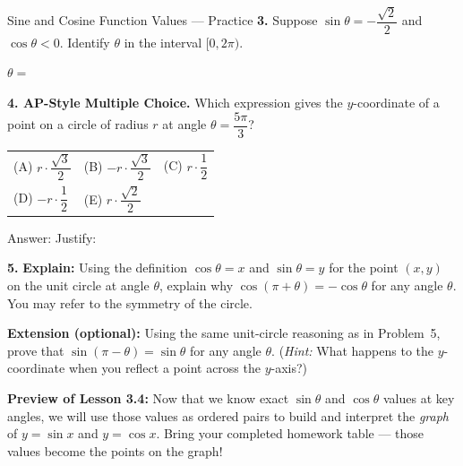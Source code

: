 \documentclass[10pt]{article}
\begin{document}
\begin{notesbox}{Sine and Cosine Function Values --- Practice}
\textbf{3.} Suppose $\sin\theta = -\dfrac{\sqrt{2}}{2}$ and $\cos\theta < 0$.
Identify $\theta$ in the interval $[0, 2\pi)$.

\vspace{0.6in}

$\theta = $ \underline{\hspace{2.2cm}}

\vspace{0.14in}

\textbf{4. AP-Style Multiple Choice.} Which expression gives the $y$-coordinate of
a point on a circle of radius $r$ at angle $\theta = \dfrac{5\pi}{3}$?

\medskip
\begin{tabular}{@{}lll@{}}
(A) $r \cdot \dfrac{\sqrt{3}}{2}$ \quad &
(B) $-r \cdot \dfrac{\sqrt{3}}{2}$ \quad &
(C) $r \cdot \dfrac{1}{2}$ \\[8pt]
(D) $-r \cdot \dfrac{1}{2}$ \quad &
(E) $r \cdot \dfrac{\sqrt{2}}{2}$ &
\end{tabular}

\vspace{0.1in}
Answer: \underline{\hspace{1.6cm}} \quad Justify: \underline{\hspace{6.5cm}}

\vspace{0.14in}

\textbf{5.} \textbf{Explain:} Using the definition $\cos\theta = x$ and $\sin\theta = y$
for the point $(x, y)$ on the unit circle at angle $\theta$, explain why $\cos(\pi + \theta) = -\cos\theta$
for any angle $\theta$. You may refer to the symmetry of the circle.

\vspace{1.1in}

\end{notesbox}

\begin{extensionbox}
\textbf{Extension (optional):} Using the same unit-circle reasoning as in Problem~5,
prove that $\sin(\pi - \theta) = \sin\theta$ for any angle $\theta$.
(\textit{Hint:} What happens to the $y$-coordinate when you reflect a point across the $y$-axis?)
\end{extensionbox}

\vspace{0.1in}

\begin{tcolorbox}[colback=goldbg, colframe=goldacc, arc=2mm,
    left=3mm, right=3mm, top=2mm, bottom=2mm]
\small\textbf{Preview of Lesson 3.4:} Now that we know exact $\sin\theta$ and $\cos\theta$ values
at key angles, we will use those values as ordered pairs to build and interpret the
\emph{graph} of $y = \sin x$ and $y = \cos x$. Bring your completed homework table --- those
values become the points on the graph!
\end{tcolorbox}
\end{document}
